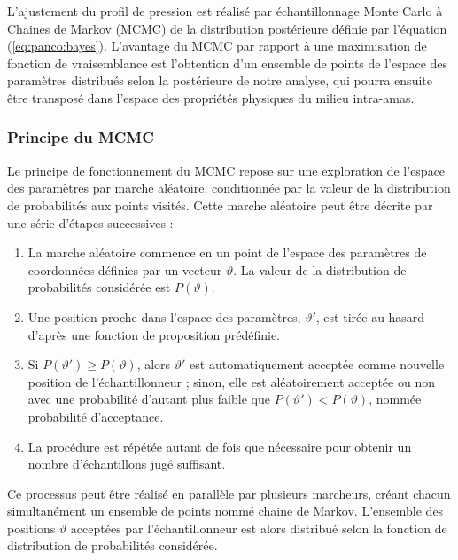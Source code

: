 L'ajustement du profil de pression est réalisé par échantillonnage Monte Carlo à Chaines de Markov (MCMC) de la distribution postérieure définie par l'équation (\ref{eq:panco:bayes}).
L'avantage du MCMC par rapport à une maximisation de fonction de vraisemblance est l'obtention d'un ensemble de points de l'espace des paramètres distribués selon la postérieure de notre analyse, qui pourra ensuite être transposé dans l'espace des propriétés physiques du milieu intra-amas.

\subsubsection{Principe du MCMC} %
Le principe de fonctionnement du MCMC repose sur une exploration de l'espace des paramètres par marche aléatoire, conditionnée par la valeur de la distribution de probabilités aux points visités.
Cette marche aléatoire peut être décrite par une série d'étapes successives :

\begin{enumerate}[leftmargin=*]
    \item La marche aléatoire commence en un point de l'espace des paramètres de coordonnées définies par un vecteur $\vartheta$.
        La valeur de la distribution de probabilités considérée est $P(\vartheta)$.
    \item Une position proche dans l'espace des paramètres, $\vartheta'$, est tirée au hasard d'après une fonction de proposition prédéfinie.
    \item Si $P(\vartheta') \geqslant P(\vartheta)$, alors $\vartheta'$ est automatiquement acceptée comme nouvelle position de l'échantillonneur ; sinon, elle est aléatoirement acceptée ou non avec une probabilité d'autant plus faible que $P(\vartheta') < P(\vartheta)$, nommée probabilité d'acceptance.
    \item La procédure est répétée autant de fois que nécessaire pour obtenir un nombre d'échantillons jugé suffisant.
\end{enumerate}

Ce processus peut être réalisé en parallèle par plusieurs marcheurs, créant chacun simultanément un ensemble de points nommé chaine de Markov.
L'ensemble des positions $\vartheta$ acceptées par l'échantillonneur est alors distribué selon la fonction de distribution de probabilités considérée.

